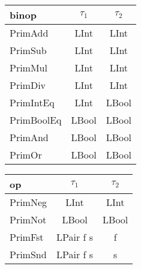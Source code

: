 \documentclass[a4paper]{scrreprt}
\begin{document}
\begin{table}[ht]
  \centering
  \begin{tabular}[t]{lcc}
    binop      & $\tau_1$ & $\tau_2$ \\
    \midrule
    PrimAdd    & LInt     & LInt     \\
    PrimSub    & LInt     & LInt     \\
    PrimMul    & LInt     & LInt     \\
    PrimDiv    & LInt     & LInt     \\
    PrimIntEq  & LInt     & LBool    \\
    PrimBoolEq & LBool    & LBool    \\
    PrimAnd    & LBool    & LBool    \\
    PrimOr     & LBool    & LBool    \\
  \end{tabular}
  \quad
  \centering
  \begin{tabular}[t]{lcc}
    op      & $\tau_1$  & $\tau_2$ \\
    \midrule
    PrimNeg & LInt      & LInt     \\
    PrimNot & LBool     & LBool    \\
    PrimFst & LPair f s & f        \\
    PrimSnd & LPair f s & s        \\
  \end{tabular}
\end{table}
\end{document}
